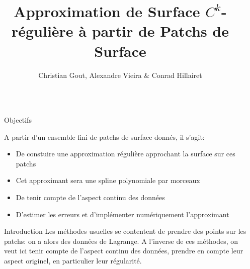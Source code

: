 \documentclass[final]{beamer}
\title{Approximation de Surface $C^k$-régulière à partir de Patchs de Surface} %
\author{Christian Gout, Alexandre Vieira \& Conrad Hillairet} %
\institute{INSA de Rouen - Université de Rouen} %
\newlength{\sepwid}
\newlength{\onecolwid}
\begin{document}

\setlength{\belowcaptionskip}{2ex} %
\setlength\belowdisplayshortskip{2ex} %

\begin{frame}[t] %

\begin{columns}[t] %

\begin{column}{\sepwid}\end{column} %

\begin{column}{\onecolwid} %


\begin{alertblock}{Objectifs}

A partir d'un ensemble fini de patchs de surface donnés, il s'agit:
\begin{itemize}
\item De constuire une approximation régulière approchant la surface sur ces patchs
\item Cet approximant sera une spline polynomiale par morceaux 
\item De tenir compte de l'aspect continu des données  
\item D'estimer les erreurs et d'implémenter numériquement l'approximant
\end{itemize}

\end{alertblock}


\begin{block}{Introduction}
Les méthodes usuelles se contentent de prendre des points sur les patchs: on a alors des 
données de Lagrange. A l'inverse de ces méthodes, on veut ici tenir compte de l'aspect continu des données, prendre en compte leur aspect originel, en particulier leur régularité.\\


\end{block}
\end{column}
\end{columns}
\end{frame}
\end{document}

